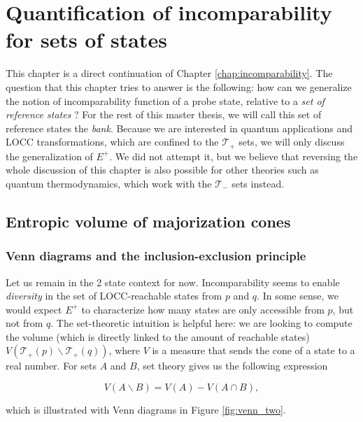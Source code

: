 \chapter{Quantification of incomparability for sets of states} \label{chap:volume}

This chapter is a direct continuation of Chapter \ref{chap:incomparability}. The question that this chapter tries to answer is the following: how can we generalize the notion of incomparability function of a probe state, relative to a \textit{set of reference states} ? For the rest of this master thesis, we will call this set of reference states the \textit{bank}. Because we are interested in quantum applications and LOCC transformations, which are confined to the $\mathcal{T}_+$ sets, we will only discuss the generalization of $E^+$. We did not attempt it, but we believe that reversing the whole discussion of this chapter is also possible for other theories such as quantum thermodynamics, which work with the $\mathcal{T}_-$ sets instead.%



\section{Entropic volume of majorization cones}

\subsection{Venn diagrams and the inclusion-exclusion principle}

Let us remain in the 2 state context for now. Incomparability seems to enable \textit{diversity} in the set of LOCC-reachable states from $p$ and $q$. In some sense, we would expect $E^+$ to characterize how many states are only accessible from $p$, but not from $q$. The set-theoretic intuition is helpful here: we are looking to compute the volume (which is directly linked to the amount of reachable states) $V(\mathcal{T}_+(p) \backslash \mathcal{T}_+(q))$, where $V$ is a measure that sends the cone of a state to a real number. For sets $A$ and $B$, set theory gives us the following expression

\begin{equation} \label{eq:2_set_exclusion}
    V(A \backslash B) = V(A) - V(A \cap B),
\end{equation}

\noindent which is illustrated with Venn diagrams in Figure \ref{fig:venn_two}.

